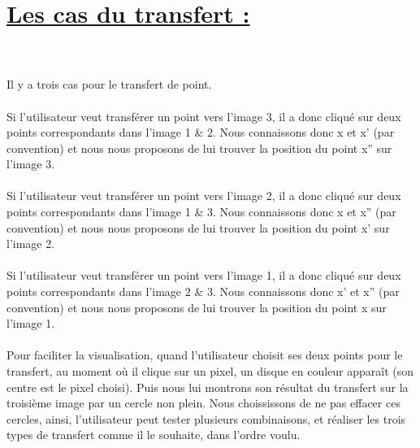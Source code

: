 \documentclass[a4paper,11pt,fleqn]{report}
\begin{document}
\section{\underline{Les cas du transfert :}}
\\\\
	Il y a trois cas pour le transfert de point.
	\\\\Si l'utilisateur veut transf\'erer un point vers l'image 3, il a donc cliqu\'e sur deux points correspondants dans l'image 1 & 2. Nous connaissons donc x et x' (par convention) et nous nous proposons de lui trouver la position du point x'' sur l'image 3.
	\\\\Si l'utilisateur veut transf\'erer un point vers l'image 2, il a donc cliqu\'e sur deux points correspondants dans l'image 1 & 3. Nous connaissons donc x et x'' (par convention) et nous nous proposons de lui trouver la position du point x' sur l'image 2.
	\\\\Si l'utilisateur veut transf\'erer un point vers l'image 1, il a donc cliqu\'e sur deux points correspondants dans l'image 2 & 3. Nous connaissons donc x' et x'' (par convention) et nous nous proposons de lui trouver la position du point x sur l'image 1.
	\\\\
	Pour faciliter la visualisation, quand l'utilisateur choisit ses deux points pour le transfert, au moment o\`u il clique sur un pixel, un disque en couleur appara\^it (son centre est le pixel choisi). Puis nous lui montrons son r\'esultat du transfert sur la troisi\`eme image par un cercle non plein. Nous choississons de ne pas effacer ces cercles, ainsi, l'utilisateur peut tester plusieurs combinaisons, et r\'ealiser les trois types de transfert comme il le souhaite, dans l'ordre voulu.
\\\\
\end{document}
